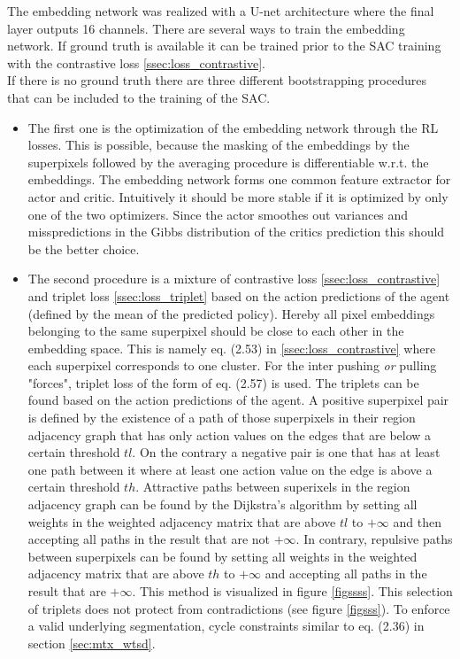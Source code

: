 The embedding network was realized with a U-net architecture where the final layer outputs 16 channels. There are several ways to train the embedding network. If ground truth is available it can be trained prior to the SAC training with the contrastive loss \ref{ssec:loss_contrastive}.\\
If there is no ground truth there are three different bootstrapping procedures that can be included to the training of the SAC.\\
\begin{itemize}
 	\item The first one is the optimization of the embedding network through the RL losses. This is possible, because the masking of the embeddings by the superpixels followed by the averaging procedure is differentiable w.r.t. the embeddings. The embedding network forms one common feature extractor for actor and critic. Intuitively it should be more stable if it is optimized by only one of the two optimizers. Since the actor smoothes out variances and misspredictions in the Gibbs distribution of the critics prediction this should be the better choice.
 	\item The second procedure is a mixture of contrastive loss \ref{ssec:loss_contrastive} and triplet loss \ref{ssec:loss_triplet} based on the action predictions of the agent (defined by the mean of the predicted policy). Hereby all pixel embeddings belonging to the same superpixel should be close to each other in the embedding space. This is namely eq. (2.53) in \ref{ssec:loss_contrastive} where each superpixel corresponds to one cluster. For the inter pushing \emph{or} pulling "forces", triplet loss of the form of eq. (2.57) is used. The triplets can be found based on the action predictions of the agent. A positive superpixel pair is defined by the existence of a path of those superpixels in their region adjacency graph that has only action values on the edges that are below a certain threshold $tl$. On the contrary a negative pair is one that has at least one path between it where at least one action value on the edge is above a certain threshold $th$. Attractive paths between superixels in the region adjacency graph can be found by the Dijkstra's algorithm by setting all weights in the weighted adjacency matrix that are above $tl$ to $+\infty$ and then accepting all paths in the result that are not $+\infty$. In contrary, repulsive paths between superpixels can be found by setting all weights in the weighted adjacency matrix that are above $th$ to $+\infty$ and accepting all paths in the result that are $+\infty$. This method is visualized in figure \ref{figssss}. This selection of triplets does not protect from contradictions (see figure \ref{figsss}). To enforce a valid underlying segmentation, cycle constraints similar to eq. (2.36) in section \ref{sec:mtx_wtsd}.

\end{itemize}
